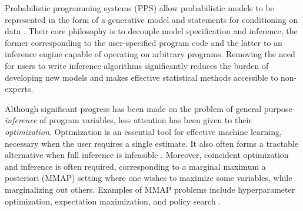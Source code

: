 
Probabilistic programming systems (PPS) allow probabilistic models to be represented in the form of a generative model and statements for conditioning on data \citep{carpenter2015stan,goodman_uai_2008,goodman_book_2014,mansinghka2014venture,minka_software_2010,wood2014new}.  
Their core philosophy is to decouple model specification and inference, the former corresponding to the user-specified program code and the latter to an inference engine capable of operating on arbitrary programs.  Removing the need for users to write inference algorithms significantly reduces the burden of developing new models and makes effective statistical methods accessible to non-experts.

Although significant progress has been made on the problem of general purpose \emph{inference} of program variables, less attention has been given to their \emph{optimization}.  Optimization is an essential tool for effective machine learning, necessary when the user requires a single estimate. It also often forms a tractable alternative when full inference is infeasible \citep{murphy2012machine}.  Moreover, coincident optimization and inference is often required, corresponding to a marginal maximum a posteriori (MMAP) setting where one wishes to maximize some variables, while marginalizing out others.  Examples of MMAP problems include hyperparameter optimization, expectation maximization, and policy search \citep{van2015black}.



